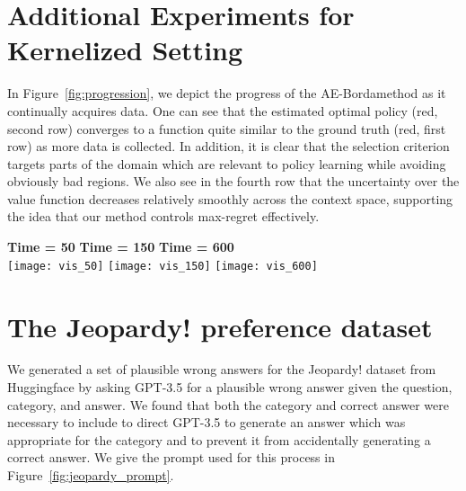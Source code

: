 \documentclass{article} \usepackage{iclr2023_conference,times}
\def\eqref#1{Eq.~(\ref{#1})}
\newcommand{\algnm}{AE-Borda}
\begin{document}
\section{Additional Experiments for Kernelized Setting}
\label{a:kocdb_addtl_experiments}

In Figure~\ref{fig:progression}, we depict the progress of the \algnm method as it continually acquires data. One can see that the estimated optimal policy (red, second row) converges to a function quite similar to the ground truth (red, first row) as more data is collected. In addition, it is clear that the selection criterion targets parts of the domain which are relevant to policy learning while avoiding obviously bad regions. We also see in the fourth row that the uncertainty over the value function decreases relatively smoothly across the context space, supporting the idea that our method controls max-regret effectively.
\begin{figure*}
    \centering
    \hspace{6mm} \textbf{Time = 50} \hspace{24mm} \textbf{Time = 150} \hspace{24mm} \textbf{Time = 600} \\
    \vspace{3mm}
    \texttt{[image: vis\_50]}
    \texttt{[image: vis\_150]}
    \texttt{[image: vis\_600]}
    \vspace{-3mm}
    \caption{Progress of \algnm~across 50, 150, and 600 datapoints. From the top downwards, the charts show the ground truth function, the mean of the posterior estimate of $f_r$, the uncertainty function, the estimate of the value function as well as the acquisition function given in \eqref{eq:context_selection}, and the regret over time.}
    \label{fig:progression}
\end{figure*}
\section{The Jeopardy! preference dataset}
\label{a:jeopardy}
We generated a set of plausible wrong answers for the Jeopardy! dataset from Huggingface \citep{jeopardy_huggingface} by asking GPT-3.5 for a plausible wrong answer given the question, category, and answer. We found that both the category and correct answer were necessary to include to direct GPT-3.5 to generate an answer which was appropriate for the category and to prevent it from accidentally generating a correct answer. We give the prompt used for this process in Figure~\ref{fig:jeopardy_prompt}.
\end{document}
